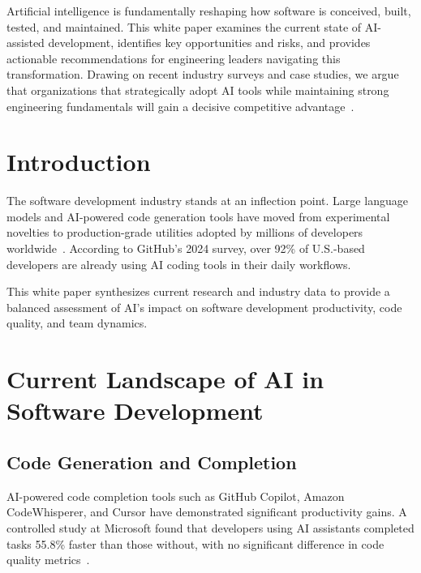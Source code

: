 \documentclass[
    language=english,
    doctype=white-paper,
    institution=none,
]{../../omnilatex}
\begin{document}
\maketitle

\begin{whitepaperabstract}
Artificial intelligence is fundamentally reshaping how software is conceived, built,
tested, and maintained. This white paper examines the current state of AI-assisted
development, identifies key opportunities and risks, and provides actionable
recommendations for engineering leaders navigating this transformation. Drawing on
recent industry surveys and case studies, we argue that organizations that
strategically adopt AI tools while maintaining strong engineering fundamentals will
gain a decisive competitive advantage~\cite{chen2024ai}.
\end{whitepaperabstract}

\tableofcontents

\section{Introduction}

The software development industry stands at an inflection point. Large language
models and AI-powered code generation tools have moved from experimental novelties
to production-grade utilities adopted by millions of developers
worldwide~\cite{microsoft2024copilot}. According to GitHub's 2024 survey, over 92\%
of U.S.-based developers are already using AI coding tools in their daily workflows.

This white paper synthesizes current research and industry data to provide a
balanced assessment of AI's impact on software development productivity, code
quality, and team dynamics.

\section{Current Landscape of AI in Software Development}

\subsection{Code Generation and Completion}

AI-powered code completion tools such as GitHub Copilot, Amazon CodeWhisperer, and
Cursor have demonstrated significant productivity gains. A controlled study at
Microsoft found that developers using AI assistants completed tasks 55.8\% faster
than those without, with no significant difference in code quality
metrics~\cite{peng2023impact}.
\end{document}
